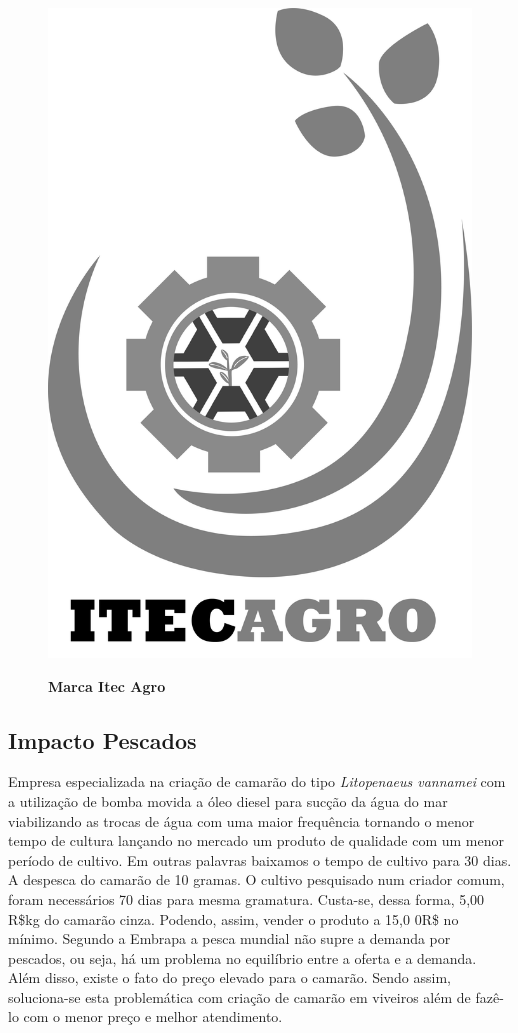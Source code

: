 \begin{figure}[!htb]
\centering
\caption{\textbf{Marca Itec Agro}}
\includegraphics[scale=0.1]{Imagens/itecagro.png}
\label{figura_46}
\end{figure}
\newpage


\subsection{Impacto Pescados}

Empresa especializada na criação de camarão do tipo \textit{Litopenaeus vannamei} com a utilização de bomba movida a óleo diesel para sucção da água do mar viabilizando as trocas de água com uma maior frequência tornando o menor tempo de cultura lançando no mercado um produto de qualidade com um menor período de cultivo. Em outras palavras baixamos o tempo de cultivo para 30 dias. A despesca do camarão de 10 gramas. O cultivo pesquisado num criador comum, foram necessários 70 dias para mesma gramatura. Custa-se, dessa forma, 5,00 R\$kg do camarão cinza. Podendo, assim, vender o produto a 15,0 0R\$ no mínimo. Segundo a Embrapa a pesca mundial não supre a demanda por pescados, ou seja, há um problema no equilíbrio entre a oferta e a demanda. Além disso, existe o fato do preço elevado para o camarão. Sendo assim, soluciona-se esta problemática com criação de camarão em viveiros além de fazê-lo com o menor preço e melhor atendimento.

